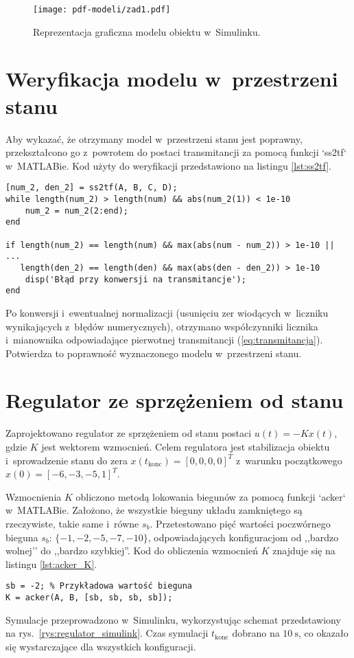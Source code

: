\documentclass[a4paper,titlepage,11pt,floatssmall]{mwrep} %
\begin{document}
\begin{figure}[H]
    \centering
    \texttt{[image: pdf-modeli/zad1.pdf]} %
    \caption{Reprezentacja graficzna modelu obiektu w~Simulinku.}
    \label{rys:model_simulink}
\end{figure}

\FloatBarrier
\section{Weryfikacja modelu w~przestrzeni stanu}

Aby wykazać, że otrzymany model w~przestrzeni stanu jest poprawny, przekształcono go z~powrotem do postaci transmitancji za pomocą funkcji `ss2tf` w~MATLABie. Kod użyty do weryfikacji przedstawiono na listingu \ref{lst:ss2tf}.
\begin{lstlisting}[style=custommatlab, caption={Weryfikacja modelu w przestrzeni stanu.}, label={lst:ss2tf}]
[num_2, den_2] = ss2tf(A, B, C, D);
while length(num_2) > length(num) && abs(num_2(1)) < 1e-10
    num_2 = num_2(2:end);
end

if length(num_2) == length(num) && max(abs(num - num_2)) > 1e-10 || ...
   length(den_2) == length(den) && max(abs(den - den_2)) > 1e-10
    disp('Błąd przy konwersji na transmitancje');
end
\end{lstlisting}
Po konwersji i~ewentualnej normalizacji (usunięciu zer wiodących w~liczniku wynikających z~błędów numerycznych), otrzymano współczynniki licznika i~mianownika odpowiadające pierwotnej transmitancji (\ref{eq:transmitancja}). Potwierdza to poprawność wyznaczonego modelu w~przestrzeni stanu.

\FloatBarrier
\section{Regulator ze sprzężeniem od stanu}

Zaprojektowano regulator ze sprzężeniem od stanu postaci $u(t) = -Kx(t)$, gdzie $K$ jest wektorem wzmocnień. Celem regulatora jest stabilizacja obiektu i~sprowadzenie stanu do zera $x(t_{\text{konc}}) = [0, 0, 0, 0]^T$ z~warunku początkowego $x(0) = [-6, -3, -5, 1]^T$.

Wzmocnienia $K$ obliczono metodą lokowania biegunów za pomocą funkcji `acker` w~MATLABie. Założono, że wszystkie bieguny układu zamkniętego są rzeczywiste, takie same i~równe $s_b$. Przetestowano pięć wartości poczwórnego bieguna $s_b$: $\{-1, -2, -5, -7, -10\}$, odpowiadających konfiguracjom od ,,bardzo wolnej'' do ,,bardzo szybkiej''. Kod do obliczenia wzmocnień $K$ znajduje się na listingu \ref{lst:acker_K}.
\begin{lstlisting}[style=custommatlab, caption={Obliczenie wzmocnień regulatora K.}, label={lst:acker_K}]
sb = -2; % Przykładowa wartość bieguna
K = acker(A, B, [sb, sb, sb, sb]);
\end{lstlisting}
Symulacje przeprowadzono w~Simulinku, wykorzystując schemat przedstawiony na rys.~\ref{rys:regulator_simulink}. Czas symulacji $t_{\text{konc}}$ dobrano na $\SI{10}{\second}$, co okazało się wystarczające dla wszystkich konfiguracji.
\end{document}
